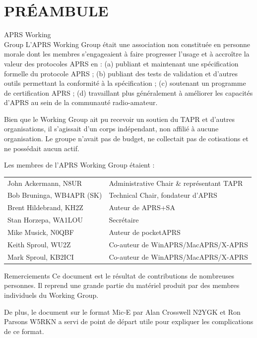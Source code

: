 \section*{PRÉAMBULE}\label{pruxe9ambule}

\begin{aprssideblock}{APRS Working\\Group}
L'APRS Working Group était une association non constituée en personne
morale dont les membres s'engageaient à faire progresser l'usage et à
accroître la valeur des protocoles APRS en : (a) publiant et maintenant
une spécification formelle du protocole APRS ; (b) publiant des tests de
validation et d'autres outils permettant la conformité à la
spécification ; (c) soutenant un programme de certification APRS ; (d)
travaillant plus généralement à améliorer les capacités d'APRS au sein
de la communauté radio-amateur.

Bien que le Working Group ait pu recevoir un soutien du TAPR et d'autres
organisations, il s'agissait d'un corps indépendant, non affilié à
aucune organisation. Le groupe n'avait pas de budget, ne collectait pas
de cotisations et ne possédait aucun actif.

Les membres de l'APRS Working Group étaient :

\begin{tabular}{@{}l@{\hspace{1.6em}}l@{}}
John Ackermann, N8UR & Administrative Chair \& représentant TAPR \\
Bob Bruninga, WB4APR (SK) & Technical Chair, fondateur d'APRS \\
Brent Hildebrand, KH2Z & Auteur de APRS+SA \\
Stan Horzepa, WA1LOU & Secrétaire \\
Mike Musick, N0QBF & Auteur de pocketAPRS \\
Keith Sproul, WU2Z & Co-auteur de WinAPRS/MacAPRS/X-APRS \\
Mark Sproul, KB2ICI & Co-auteur de WinAPRS/MacAPRS/X-APRS \\
\end{tabular}
\end{aprssideblock}

\begin{aprssideblock}{Remerciements}
Ce document est le résultat de contributions de nombreuses personnes. Il
reprend une grande partie du matériel produit par des membres
individuels du Working Group.

De plus, le document sur le format Mic-E par Alan Crosswell N2YGK et Ron
Parsons W5RKN a servi de point de départ utile pour expliquer les
complications de ce format.
\end{aprssideblock}


